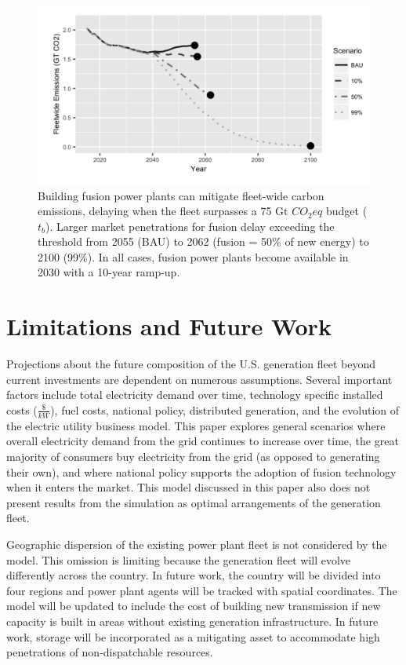 \documentclass[review]{elsarticle}
\begin{document}
\begin{figure}
\begin{center}
\includegraphics[width=\textwidth]{Fig4_5.png}
\end{center}
\caption{Building fusion power plants can mitigate fleet-wide carbon emissions, delaying when the fleet surpasses a 75 Gt $CO_2eq$ budget ($t_b$). Larger market penetrations for fusion delay exceeding the threshold from 2055 (BAU) to 2062 (fusion = 50\% of new energy) to 2100 (99\%). In all cases, fusion power plants become available in 2030 with a 10-year ramp-up.}
\label{fig:co2budget}
\end{figure}

\section{Limitations and Future Work}

Projections about the future composition of the U.S. generation fleet beyond current investments are dependent on numerous assumptions. Several important factors include total electricity demand over time, technology specific installed costs ($\frac{\$}{kW}$), fuel costs, national policy, distributed generation, and the evolution of the electric utility business model. This paper explores general scenarios where overall electricity demand from the grid continues to increase over time, the great majority of consumers buy electricity from the grid (as opposed to generating their own), and where national policy supports the adoption of fusion technology when it enters the market. This model discussed in this paper also does not present results from the simulation as optimal arrangements of the generation fleet. 

Geographic dispersion of the existing power plant fleet is not considered by the model. This omission is limiting because the generation fleet will evolve differently across the country. In future work, the country will be divided into four regions and power plant agents will be tracked with spatial coordinates. The model will be updated to include the cost of building new transmission if new capacity is built in areas without existing generation infrastructure. In future work, storage will be incorporated as a mitigating asset to accommodate high penetrations of non-dispatchable resources.
\end{document}
